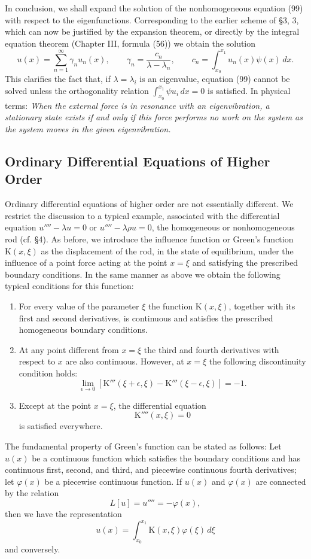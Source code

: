 In conclusion, we shall expand the solution of the nonhomogeneous equation (99) with respect to the eigenfunctions. Corresponding to the earlier scheme of \S3, 3, which can now be justified by the expansion theorem, or directly by the integral equation theorem (Chapter III, formula (56)) we obtain the solution
\[
u(x)=\sum_{n=1}^{\infty}\gamma_nu_n(x),
\qquad
\gamma_n=\frac{c_n}{\lambda-\lambda_n},
\qquad
c_n=\int_{x_0}^{x_1}u_n(x)\psi(x)\,dx.
\]
This clarifies the fact that, if $\lambda=\lambda_i$ is an eigenvalue, equation (99) cannot be solved unless the orthogonality relation $\int_{x_0}^{x_1}\psi u_i\,dx=0$ is satisfied. In physical terms: \emph{When the external force is in resonance with an eigenvibration, a stationary state exists if and only if this force performs no work on the system as the system moves in the given eigenvibration.}

\subsection{Ordinary Differential Equations of Higher Order}
Ordinary differential equations of higher order are not essentially different. We restrict the discussion to a typical example, associated with the differential equation $u''''-\lambda u=0$ or $u''''-\lambda\rho u=0$, the homogeneous or nonhomogeneous rod (cf. \S4). As before, we introduce the influence function or Green's function $\mathrm K(x,\xi)$ as the displacement of the rod, in the state of equilibrium, under the influence of a point force acting at the point $x=\xi$ and satisfying the prescribed boundary conditions. In the same manner as above we obtain the following typical conditions for this function:
\begin{enumerate}[label=(\arabic*)]
\item For every value of the parameter $\xi$ the function $\mathrm K(x,\xi)$, together with its first and second derivatives, is continuous and satisfies the prescribed homogeneous boundary conditions.
\item At any point different from $x=\xi$ the third and fourth derivatives with respect to $x$ are also continuous. However, at $x=\xi$ the following discontinuity condition holds:
\[
\lim_{\epsilon\to0}[\mathrm K'''(\xi+\epsilon,\xi)-\mathrm K'''(\xi-\epsilon,\xi)]=-1.
\]
\item Except at the point $x=\xi$, the differential equation
\[
\mathrm K''''(x,\xi)=0
\]
is satisfied everywhere.
\end{enumerate}
The fundamental property of Green's function can be stated as follows: Let $u(x)$ be a continuous function which satisfies the boundary conditions and has continuous first, second, and third, and piecewise continuous fourth derivatives; let $\varphi(x)$ be a piecewise continuous function. If $u(x)$ and $\varphi(x)$ are connected by the relation
\[
L[u]=u''''=-\varphi(x),
\]
then we have the representation
\[
u(x)=\int_{x_0}^{x_1}\mathrm K(x,\xi)\varphi(\xi)\,d\xi
\]
and conversely.

